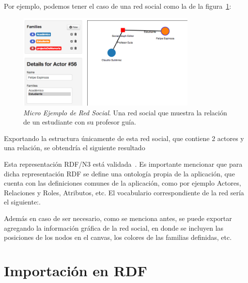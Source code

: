 Por ejemplo, podemos tener el caso de una red social como la de la figura~\ref{mini_red_ejemplo}:

\begin{figure}[H]
  \centering
  \includegraphics[width=0.8\textwidth]{images/mini_red_ejemplo.png}
  \caption[Micro Ejemplo de Red Social]{\emph{Micro Ejemplo de Red Social}. Una red social que muestra la relación de un estudiante con su profesor guía.}
  \label{mini_red_ejemplo}
\end{figure}


Exportando la estructura únicamente de esta red social, que contiene 2 actores y una relación, se obtendría el siguiente resultado\\


\label{lst:red_n3}

Esta representación RDF/N3 está validada~\cite{validador_rdf}. Es importante mencionar que para dicha representación RDF se define una ontología propia de la aplicación, que cuenta con las definiciones comunes de la aplicación, como por ejemplo Actores, Relaciones y Roles, Atributos, etc. El vocabulario correspondiente de la red sería el siguiente:.


\label{lst:vocabulario_n3}

Además en caso de ser necesario, como se menciona antes, se puede exportar agregando la información gráfica de la red social, en donde se incluyen las posiciones de los nodos en el canvas, los colores de las familias definidas, etc.


\section{Importación en RDF} %
\label{sec:importacion_en_rdf}

